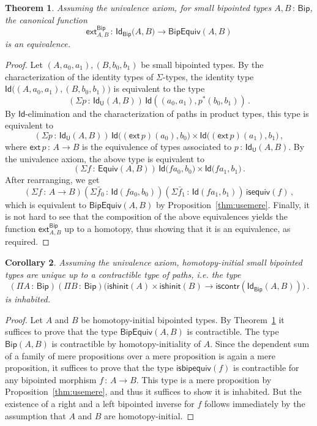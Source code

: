 \documentclass[10pt,a4paper,oneside,reqno]{amsart}
\numberwithin{equation}{section}
\theoremstyle{mythm}
\newtheorem{theorem}{Theorem}[section]
\newtheorem{corollary}[theorem]{Corollary}
\theoremstyle{mydef}
\theoremstyle{myrmk}
\newcommand{\co}{\,{:}\,}
\newcommand{\iscontr}{\mathsf{iscontr}}
\newcommand{\isequiv}{\mathsf{isequiv}}
\newcommand{\isbiphinit}{\mathsf{ishinit}}
\newcommand{\Eq}{\mathsf{Equiv}}
\newcommand{\ext}{\mathsf{ext}}
\newcommand{\Id}{\mathsf{Id}}
\newcommand{\U}{\mathsf{U}}
\newcommand{\Bip}{\mathsf{Bip}}
\newcommand{\BipHom}{\mathsf{Bip}}
\newcommand{\isbipequiv}{\mathsf{isbipequiv}}
\newcommand{\BipEquiv}{\mathsf{BipEquiv}}
\begin{document}
\begin{theorem}  \label{thm:bipunivalence} Assuming the univalence axiom, 
for small bipointed types $A, B \co \Bip$, the  canonical function
\[ 
\ext^{\Bip}_{A,B} \co \Id_{\Bip} \big(A,B\big) \to  \BipEquiv(A,B) 
\] 
is an equivalence.
\end{theorem} 

\begin{proof} 
Let $ (A,a_0,a_1), (B,b_0,b_1)$ be small bipointed types. By the characterization of the identity types
of $\Sigma$-types, the 
identity type $\Id\big( (A,a_0,a_1),  (B,b_0,b_1)\big)$ is equivalent to  the type
\[
(\Sigma p \co \Id_\U(A,B))  \, \Id(( a_0,a_1 ),  p^* ( b_0,b_1))  \, .
\]
By $\Id$-elimination and the characterization of paths in product types, this type is equivalent to
\[ 
(\Sigma p \co \Id_\U(A,B)) \, \Id \big( (\ext \, p)(a_0),  b_0\big) \times \Id \big( (\ext \, p)(a_1) , b_1) \, ,
 \]
where $\ext \, p \co A \to B$ is the equivalence of types associated to $p \co \Id_\U(A,B)$.  By the univalence axiom,
the above type is equivalent to
\[ 
(\Sigma f \co \Eq(A,B)) \, \Id \big( f a_0 ,  b_0\big) \times \Id \big( f a_1 , b_1\big)  \, .
\]
After rearranging, we get
\[
(\Sigma f  \co A \to B)(\Sigma \bar{f}_0 \co \Id( fa_0, b_0)) (\Sigma \bar{f}_1 \co \Id( fa_1, b_1))  \, \isequiv(f) \, ,
\]
which is equivalent to $\BipEquiv(A,B)$ by Proposition~\ref{thm:usemere}. Finally, it is not hard to see that the composition of the above equivalences yields the  function $\ext^{\Bip}_{A,B}$ up to a homotopy, thus showing that it is an equivalence, as required.
\end{proof} 

\begin{corollary} \label{BoolHInitIso} 
Assuming the univalence axiom, 
homotopy-initial small bipointed types are unique up to a contractible type of paths, i.e. the type
\[ 
(\Pi A \co \Bip) (\Pi B \co \Bip)
\big( \isbiphinit(A) \times \isbiphinit(B) \to \iscontr(\Id_\Bip(A,B)) \big) \, .
\] 
is inhabited.
\end{corollary}

\begin{proof} Let $A$ and $B$ be homotopy-initial bipointed types. 
By Theorem~\ref{thm:bipunivalence} it suffices to prove that the type $\BipEquiv(A,B)$ is contractible. The type 
$\BipHom( A, B)$ is contractible by homotopy-initiality of $A$. Since the dependent sum of a family of mere propositions over a mere proposition is again a mere proposition, it suffices to prove that the type $\isbipequiv(f)$ is contractible for any bipointed morphism $f \co A \to B$. This type is a mere proposition by 
Proposition~\ref{thm:usemere}, and thus it suffices to show it is inhabited. But the existence of a right and a left bipointed inverse for $f$ follows immediately
by the assumption that $A$ and $B$ are homotopy-initial.
\end{proof}
\end{document}
